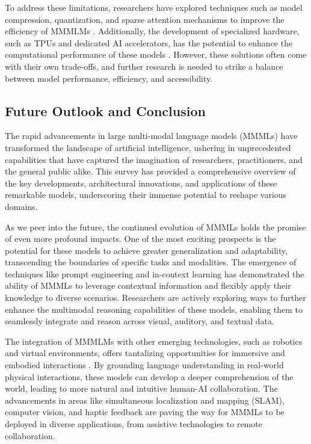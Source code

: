 \documentclass[11pt]{article}
\begin{document}
To address these limitations, researchers have explored techniques such as model compression, quantization, and sparse attention mechanisms to improve the efficiency of MMMLMs \cite{ref101}. Additionally, the development of specialized hardware, such as TPUs and dedicated AI accelerators, has the potential to enhance the computational performance of these models \cite{ref101}. However, these solutions often come with their own trade-offs, and further research is needed to strike a balance between model performance, efficiency, and accessibility.

\subsection{Future Outlook and Conclusion}

The rapid advancements in large multi-modal language models (MMMLs) have transformed the landscape of artificial intelligence, ushering in unprecedented capabilities that have captured the imagination of researchers, practitioners, and the general public alike. This survey has provided a comprehensive overview of the key developments, architectural innovations, and applications of these remarkable models, underscoring their immense potential to reshape various domains.

As we peer into the future, the continued evolution of MMMLs holds the promise of even more profound impacts. One of the most exciting prospects is the potential for these models to achieve greater generalization and adaptability, transcending the boundaries of specific tasks and modalities. The emergence of techniques like prompt engineering and in-context learning \cite{ref108} has demonstrated the ability of MMMLs to leverage contextual information and flexibly apply their knowledge to diverse scenarios. Researchers are actively exploring ways to further enhance the multimodal reasoning capabilities of these models, enabling them to seamlessly integrate and reason across visual, auditory, and textual data.

The integration of MMMLMs with other emerging technologies, such as robotics and virtual environments, offers tantalizing opportunities for immersive and embodied interactions \cite{ref6}. By grounding language understanding in real-world physical interactions, these models can develop a deeper comprehension of the world, leading to more natural and intuitive human-AI collaboration. The advancements in areas like simultaneous localization and mapping (SLAM), computer vision, and haptic feedback are paving the way for MMMLs to be deployed in diverse applications, from assistive technologies to remote collaboration.
\end{document}
